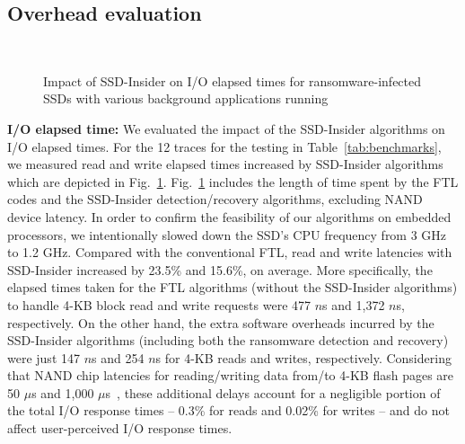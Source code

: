 \documentclass[conference]{IEEEtran}
\newcommand{\ours}{SSD-Insider}
\begin{document}
\subsection{Overhead evaluation}\label{sec:oeval}
\begin{figure}[b!]
	\centering 
	 \\
	\caption{Impact of \ours{} on I/O elapsed times for ransomware-infected SSDs with various background applications running}
	\label{fig:flash-avg-resp}
\end{figure}
{\bf I/O elapsed time:} 
We evaluated the impact of the \ours{} algorithms on I/O elapsed
times.  For the 12 traces for the testing in
Table~\ref{tab:benchmarks}, we measured read and write elapsed
times increased by \ours{} algorithms which are depicted in
Fig.~\ref{fig:flash-avg-resp}.  Fig.~\ref{fig:flash-avg-resp}
includes the length of time spent by the FTL codes and the \ours{}
detection/recovery algorithms, excluding NAND device latency.  In
order to confirm the feasibility of our algorithms on embedded
processors, we intentionally slowed down the SSD's CPU frequency
from 3 GHz to 1.2 GHz.  Compared with the conventional FTL, read
and write latencies with \ours{} increased by 23.5\% and 15.6\%, on
average.  More specifically, the elapsed times taken for the FTL
algorithms (without the \ours{} algorithms) to handle 4-KB block
read and write requests were 477 $n$s and 1,372 $n$s, respectively.
On the other hand, the extra software overheads incurred by the
\ours{} algorithms (including both the ransomware detection and
recovery) were just 147 $n$s and 254 $n$s for 4-KB reads and
writes, respectively. Considering that NAND chip latencies for
reading/writing data from/to 4-KB flash pages are 50 $\mu$s and
1,000 $\mu$s~\cite{micron-nand}, these additional delays account
for a negligible portion of the total I/O response times -- 0.3\%
for reads and 0.02\% for writes -- and do not affect user-perceived
I/O response times.
\end{document}
